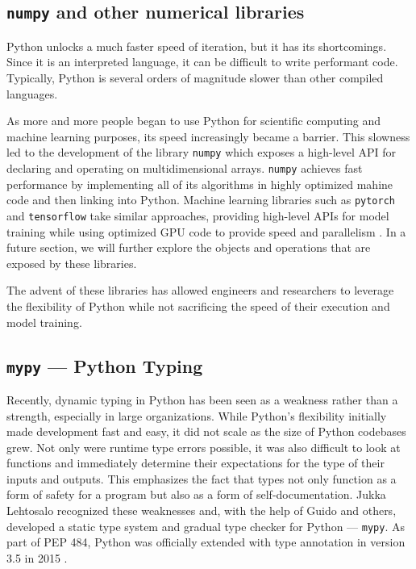 \documentclass[12pt]{report}
\begin{document}
\subsection{\texttt{numpy} and other numerical libraries}

Python unlocks a much faster speed of iteration, but it has its shortcomings. Since it is an interpreted language, it can be difficult to write performant code. Typically, Python is several orders of magnitude slower than other compiled languages.

As more and more people began to use Python for scientific computing and machine learning purposes, its speed increasingly became a barrier. This slowness led to the development of the library \texttt{numpy} which exposes a high-level API for declaring and operating on multidimensional arrays. \texttt{numpy} achieves fast performance by implementing all of its algorithms in highly optimized mahine code and then linking into Python. Machine learning libraries such as \texttt{pytorch} and \texttt{tensorflow} take similar approaches, providing high-level APIs for model training while using optimized GPU code to provide speed and parallelism \cite{Paszke2017AutomaticDI}. In a future section, we will further explore the objects and operations that are exposed by these libraries.

The advent of these libraries has allowed engineers and researchers to leverage the flexibility of Python while not sacrificing the speed of their execution and model training.

\subsection{\texttt{mypy} --- Python Typing}

Recently, dynamic typing in Python has been seen as a weakness rather than a strength, especially in large organizations. While Python's flexibility initially made development fast and easy, it did not scale as the size of Python codebases grew. Not only were runtime type errors possible, it was also difficult to look at functions and immediately determine their expectations for the type of their inputs and outputs. This emphasizes the fact that types not only function as a form of safety for a program but also as a form of self-documentation. Jukka Lehtosalo recognized these weaknesses and, with the help of Guido and others, developed a static type system and gradual type checker for Python --- \texttt{mypy}. As part of PEP 484, Python was officially extended with type annotation in version 3.5 in 2015 \cite{pep484}.
\end{document}
